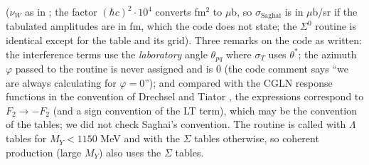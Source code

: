 \documentclass{simcnote}
\begin{document}
($\nu_W$ as in ; the factor $(\hbar c)^2\cdot10^4$ converts fm$^2$ to $\mu$b, so $\sigma_\mathrm{Saghai}$ is in $\mu$b/sr if the tabulated amplitudes are in fm, which the code does not state; the $\Sigma^0$ routine is identical except for the table and its grid). Three remarks on
the code as written: the interference terms use the \emph{laboratory} angle $\theta_{pq}$ where $\sigma_T$ uses
$\theta^*$; the azimuth $\varphi$ passed to the routine is never assigned and is 0 (the code comment says ``we are always
calculating for $\varphi=0$''); and compared with the CGLN response functions in the convention of Drechsel and Tiator
, the expressions correspond to $F_2\to-F_2$ (and a sign convention of the LT term), which may be the convention
of the tables; we did not check Saghai's convention. The routine is called with $\Lambda$ tables for $M_Y<1150$ MeV
and with the $\Sigma$ tables otherwise, so coherent production (large $M_Y$) also uses the $\Sigma$ tables.
\end{document}
